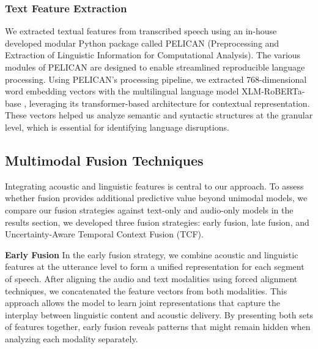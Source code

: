 \documentclass[9pt,a4paper]{rho-class/rho}
\begin{document}
\subsubsection{Text Feature Extraction}

We extracted textual features from transcribed speech using an in-house developed modular Python package called PELICAN (Preprocessing and Extraction of Linguistic Information for Computational Analysis). The various modules of PELICAN are designed to enable streamlined reproducible language processing. Using PELICAN's processing pipeline, we extracted 768-dimensional word embedding vectors with the multilingual language model XLM-RoBERTa-base \cite{conneau2019unsupervised}, leveraging its transformer-based architecture for contextual representation. These vectors helped us analyze semantic and syntactic structures at the granular level, which is essential for identifying language disruptions.





\subsection{Multimodal Fusion Techniques}

Integrating acoustic and linguistic features is central to our approach. To assess whether fusion provides additional predictive value beyond unimodal models, we compare our fusion strategies against text-only and audio-only models in the results section, we developed three fusion strategies: early fusion, late fusion, and Uncertainty-Aware Temporal Context Fusion (TCF). 

\textbf{Early Fusion} In the early fusion strategy, we combine acoustic and linguistic features at the utterance level to form a unified representation for each segment of speech. After aligning the audio and text modalities using forced alignment techniques, we concatenated the feature vectors from both modalities. This approach allows the model to learn joint representations that capture the interplay between linguistic content and acoustic delivery. By presenting both sets of features together, early fusion reveals  patterns that might remain hidden when analyzing each modality separately.
\end{document}

